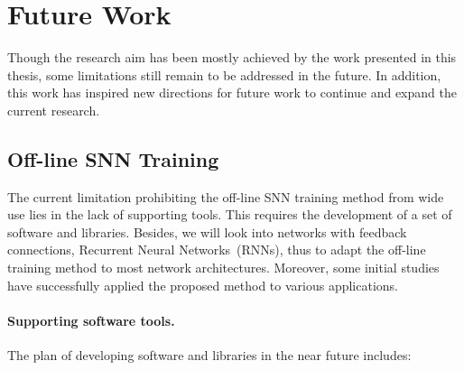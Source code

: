 %



\section{Future Work}
Though the research aim has been mostly achieved by the work presented in this thesis, some limitations still remain to be addressed in the future.
In addition, this work has inspired new directions for future work to continue and expand the current research.

\subsection{Off-line SNN Training}
The current limitation prohibiting the off-line SNN training method from wide use lies in the lack of supporting tools.
This requires the development of a set of software and libraries.
Besides, we will look into networks with feedback connections, Recurrent Neural Networks~(RNNs), thus to adapt the off-line training method to most network architectures.
Moreover, some initial studies have successfully applied the proposed method to various applications. 


\paragraph{Supporting software tools.}
The plan of developing software and libraries in the near future includes:

